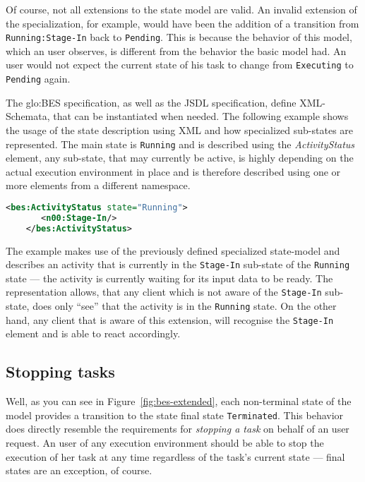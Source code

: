 Of course,  not all extensions to  the state model are  valid.  An invalid
extension of the specialization, for example, would have been the addition
of a  transition from \texttt{Running:Stage-In}  back to \texttt{Pending}.
This is  because the behavior  of this model,  which an user  observes, is
different from the behavior the basic  model had. An user would not expect
the  current  state of  his  task  to  change from  \texttt{Executing}  to
\texttt{Pending} again.

The \gls{glo:BES} specification, as well as the JSDL specification, define
XML-Schemata, that can be instantiated when needed.  The following example
shows the  usage of  the state description  using XML and  how specialized
sub-states  are represented.  The  main state  is \texttt{Running}  and is
described using the \emph{ActivityStatus} element, any sub-state, that may
currently  be  active,  is   highly  depending  on  the  actual  execution
environment in place and is therefore described using one or more elements
from a different namespace.

\begin{minipage}{0.75\textwidth}
  \begin{lstlisting}[language=XML]
    <bes:ActivityStatus state="Running">
       <n00:Stage-In/>
    </bes:ActivityStatus>
  \end{lstlisting}
\end{minipage}

The example  makes use of  the previously defined  specialized state-model
and  describes an  activity  that is  currently  in the  \texttt{Stage-In}
sub-state of the \texttt{Running} state --- \ie the activity is currently
waiting for its  input data to be ready.   The representation allows, that
any client  which is  not aware of  the \texttt{Stage-In}  sub-state, does
only ``see''  that the activity is  in the \texttt{Running}  state. On the
other hand, any client that is aware of this extension, will recognise the
\texttt{Stage-In} element and is able to react accordingly.


\subsection{Stopping tasks}
\label{sec:stopping-task}

Well, as  you can see in  Figure~\ref{fig:bes-extended}, each non-terminal
state  of  the  model provides  a  transition  to  the state  final  state
\texttt{Terminated}. This behavior does directly resemble the requirements
for \emph{stopping a  task} on behalf of an user  request.  An user of
any execution environment should be able to stop the execution of her task
at any time regardless of the task's current state --- final states are an
exception, of course.

